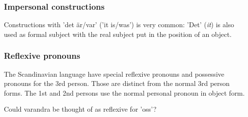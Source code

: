 \documentclass{report}
\begin{document}

\subsubsection*{Impersonal constructions}
Constructions with 'det är/var' ('it is/was') is very common\cite[\textsection 309d]{H&H}:
'Det' (\emph{it}) is also used as formal subject %
with the real subject put in the position of an object.

\subsubsection*{Reflexive pronouns}
\label{swe:refl}
The Scandinavian language have special reflexive pronouns
and possessive pronouns for the 3rd
person\cite[ \& 319]{H&H}. Those are distinct from the normal 3rd person forms.
The 1st and 2nd persons use the normal personal pronoun in object form.


Could varandra be thought of as reflexive for 'oss'?
\end{document}
